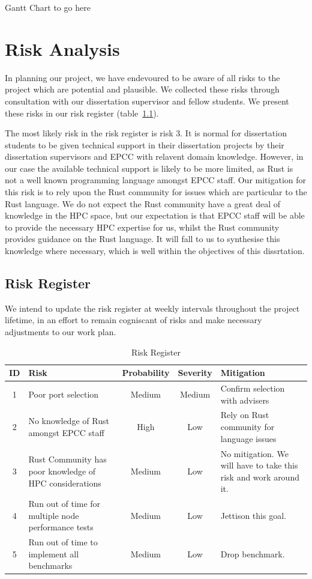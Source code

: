 \documentclass{report}[a4]
\begin{document}
Gantt Chart to go here

\chapter{Risk Analysis}
In planning our project, we have endevoured to be aware of all risks to the project which are potential and plausible. We collected these risks through consultation with our dissertation supervisor and fellow students. We present these risks in our risk register (table~\ref{tab:risk}).

The most likely risk in the risk register is risk 3. It is normal for dissertation students to be given technical support in their dissertation projects by their dissertation supervisors and EPCC with relavent domain knowledge. However, in our case the available technical support is likely to be more limited, as Rust is not a well known programming language amongst EPCC staff. Our mitigation for this risk is to rely upon the Rust community for issues which are particular to the Rust language. We do not expect the Rust community have a great deal of knowledge in the HPC space, but our expectation is that EPCC staff will be able to provide the necessary HPC expertise for us, whilst the Rust community provides guidance on the Rust language. It will fall to us to synthesise this knowledge where necessary, which is well within the objectives of this dissrtation.

\section{Risk Register}
We intend to update the risk register at weekly intervals throughout the project lifetime, in an effort to remain cogniscant of risks and make necessary adjustments to our work plan.

\begin{table}[h]
  \centering
  \begin{tabular}{c | p{4cm} c c p{4cm}}
  ID & Risk & Probability & Severity & Mitigation \\
    \hline
  1 &  Poor port selection & Medium & Medium & Confirm selection with advisers \\ \hline
  2 &  No knowledge of Rust amongst EPCC staff & High & Low & Rely on Rust community for language issues \\
    \hline
  3&  Rust Community has poor knowledge of HPC considerations & Medium & Low & No mitigation. We will have to take this risk and work around it. \\
    \hline
4 &    Run out of time for multiple node performance tests & Medium & Low & Jettison this goal. \\
\hline
5 & Run out of time to implement all benchmarks & Medium & Low & Drop benchmark. \\
    \end{tabular}
  \caption{Risk Register}
  \label{tab:risk}
\end{table}
\end{document}
